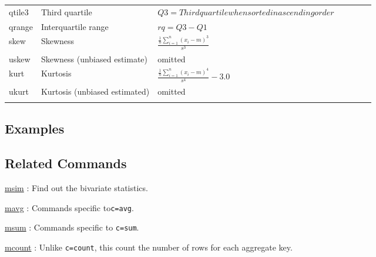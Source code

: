 \begin{table}[t]
{\begin{tabular}{lp{4cm}lp{4cm}lp{3cm}l}
qtile3 & Third quartile      & $Q3=Third quartile when sorted in ascending order$ & \\
qrange & Interquartile range      & $rq=Q3-Q1$ & \\
skew   & Skewness             & $\frac{\frac{1}{n}\sum_{i=1}^n (x_i-m)^3}{s^3}$ & \\
uskew  & Skewness (unbiased estimate) & omitted & \\
kurt   & Kurtosis             & $\frac{\frac{1}{n}\sum_{i=1}^n (x_i-m)^4}{s^4}-3.0$ & \\
ukurt  & Kurtosis (unbiased estimated) & omitted & \\
\hline \\
\end{tabular}
}
\end{table}

\subsection*{Examples}

\subsection*{Related Commands}
\hyperref[sect:msim]{msim} : Find out the bivariate statistics.

\hyperref[sect:mavg] {mavg} : Commands specific to\verb|c=avg|.

\hyperref[sect:msum] {msum} : Commands specific to \verb|c=sum|.

\hyperref[sect:mcount] {mcount} : Unlike \verb|c=count|, this count the number of rows for each aggregate key.

%
